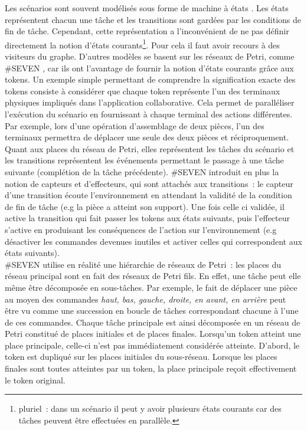 \documentclass[11pt]{article}
\begin{document}
Les scénarios sont souvent modélisés sous forme de machine à états \cite{state-machine}. Les états représentent chacun une tâche et les transitions sont gardées par les conditions de fin de tâche. Cependant, cette représentation a l'inconvénient de ne pas définir directement la notion d'états courants\footnote{pluriel~: dans un scénario il peut y avoir plusieurs états courants car des tâches peuvent être effectuées en parallèle.}. Pour cela il faut avoir recours à des visiteurs du graphe. D'autres modèles se basent sur les réseaux de Petri, comme \#SEVEN \cite{seven}, car ils ont l'avantage de fournir la notion d'états courants grâce aux tokens. Un exemple simple permettant de comprendre la signification exacte des tokens consiste à considérer que chaque token représente l'un des terminaux physiques impliqués dans l'application collaborative. Cela permet de paralléliser l'exécution du scénario en fournissant à chaque terminal des actions différentes. Par exemple, lors d'une opération d'assemblage de deux pièces, l'un des terminaux permettra de déplacer une seule des deux pièces et réciproquement. Quant aux places du réseau de Petri, elles représentent les tâches du scénario et les transitions représentent les événements permettant le passage à une tâche suivante (complétion de la tâche précédente). \#SEVEN introduit en plus la notion de capteurs et d'effecteurs, qui sont attachés aux transitions~: le capteur d'une transition écoute l'environnement en attendant la validité de la condition de fin de tâche (e.g la pièce a atteint son support). Une fois celle ci validée, il active la transition qui fait passer les tokens aux états suivants, puis l'effecteur s'active en produisant les conséquences de l'action sur l'environnement (e.g désactiver les commandes devenues inutiles et activer celles qui correspondent aux états suivants).
\\

\#SEVEN utilise en réalité une hiérarchie de réseaux de Petri~: les places du réseau principal sont en fait des réseaux de Petri fils. En effet, une tâche peut elle même être décomposée en sous-tâches. Par exemple, le fait de déplacer une pièce au moyen des commandes \textit{haut, bas, gauche, droite, en avant, en arrière} peut être vu comme une succession en boucle de tâches correspondant chacune à l'une de ces commandes. Chaque tâche principale est ainsi décomposée en un réseau de Petri constitué de places initiales et de places finales. Lorsqu'un token atteint une place principale, celle-ci n'est pas immédiatement considérée atteinte. D'abord, le token est dupliqué sur les places initiales du sous-réseau. Lorsque les places finales sont toutes atteintes par un token, la place principale reçoit effectivement le token original.
\\
\end{document}
